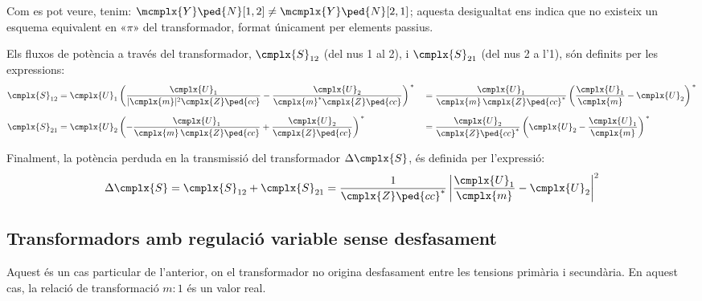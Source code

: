 Com es pot veure, tenim: $\mcmplx{Y}\ped{N}[1,2] \neq
\mcmplx{Y}\ped{N}[2,1]$; aquesta desigualtat ens indica que no existeix un esquema
equivalent en «$\pi$» del transformador, format únicament per
elements passius.

Els fluxos de potència a través del transformador, $\cmplx{S}_{12}$
(del nus 1 al 2), i $\cmplx{S}_{21}$ (del nus 2 a l'1), són definits
per les expressions: 
\begin{alignat}{2}
   \cmplx{S}_{12} &= \cmplx{U}_1 \left( \frac{\cmplx{U}_1}{|\cmplx{m}|^2 \cmplx{Z}\ped{cc}} - \frac{\cmplx{U}_2}{\cmplx{m}^* \cmplx{Z}\ped{cc}} \right)^{\,*} &&= \frac{\cmplx{U}_1}{\cmplx{m}\, \cmplx{Z}\ped{cc}^*} \left( \frac{\cmplx{U}_1}{\cmplx{m}} - \cmplx{U}_2 \right)^{\,*} \label{eq:s12_trafo_reg_decal} \\[1.5ex]
   \cmplx{S}_{21} &= \cmplx{U}_2 \left( - \frac{\cmplx{U}_1}{\cmplx{m} \,\cmplx{Z}\ped{cc}} + \frac{\cmplx{U}_2} {\cmplx{Z}\ped{cc}} \right)^{\,*} &&= \frac{\cmplx{U}_2}{\cmplx{Z}\ped{cc}^*} \left(  \cmplx{U}_2 - \frac{\cmplx{U}_1}{\cmplx{m}}  \right)^{\,*} \label{eq:s21_trafo_reg_decal}
\end{alignat}

Finalment, la potència perduda en la  transmissió del transformador  $ \Delta\cmplx{S}$, és definida per
l'expressió:
\begin{equation} \label{eq:ds_trafo_reg_decal}
   \Delta\cmplx{S} = \cmplx{S}_{12} + \cmplx{S}_{21} = \frac{1}{\cmplx{Z}\ped{cc}^*}  \left|
    \frac{\cmplx{U}_1}{\cmplx{m}} - \cmplx{U}_2 \right|^2
\end{equation}


\subsection{Transformadors amb regulació variable sense desfasament} \label{sec:trafo_reg}

Aquest és un cas particular de l'anterior, on el transformador no
origina desfasament entre les tensions primària i secundària.
En aquest cas, la relació de transformació $m\!:\!1$ és un valor real.

